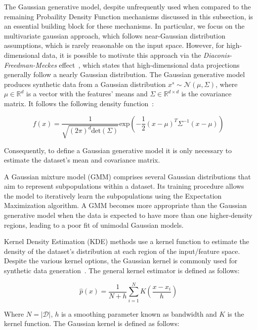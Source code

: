\documentclass[parskip=full]{scrartcl}
\begin{document}
The Gaussian generative model, despite unfrequently used when compared to the
remaining Probaility Density Function mechanisms discussed in this subsection,
is an essential building block for these mechanisms. In particular, we focus
on the multivariate gaussian approach, which follows near-Gaussian
distribution assumptions, which is rarely reasonable on the input space.
However, for high-dimensional data, it is possible to motivate this approach
via the \textit{Diaconis-Freedman-Meckes} effect~\cite{meckes2012projections},
which states that high-dimensional data projections generally follow a nearly
Gaussian distribution. The Gaussian generative model produces synthetic data
from a Gaussian distribution $x^s \sim \mathcal{N}(\mu, \Sigma)$, where $\mu
\in \mathbb{R}^d$ is a vector with the features' means and $\Sigma \in
\mathbb{R}^{d \times d}$ is the covariance matrix. It follows the following
density function~\cite{chanyaswad2019ron}:

\begin{equation}\label{eq:gaussian}
    f(x) =
    \frac{1}{\sqrt{(2\pi)^d\text{det}(\Sigma)}}\text{exp}\left(-\frac{1}{2}(x-\mu)^T\Sigma^{-1}(x-\mu)\right)
\end{equation}

Consequently, to define a Gaussian generative model it is only necessary to
estimate the dataset's mean and covariance matrix.

A Gaussian mixture model (GMM) comprises several Gaussian distributions that
aim to represent subpopulations within a dataset. Its training procedure
allows the model to iteratively learn the subpopulations using the Expectation
Maximization algorithm. A GMM becomes more appropriate than the Gaussian
generative model when the data is expected to have more than one
higher-density regions, leading to a poor fit of unimodal Gaussian models.

Kernel Density Estimation (KDE) methods use a kernel function to estimate the
density of the dataset's distribution at each region of the input/feature
space. Despite the various kernel options, the Gaussian kernel is commonly
used for synthetic data generation~\cite{tang2015kerneladasyn}. The general
kernel estimator is defined as follows: 

\begin{equation}
    \hat{p}(x) = \frac{1}{N+h}
    \sum_{i=1}^{N}K\left(\frac{x-x_i}{h}\right)
\end{equation}

Where $N = |\mathcal{D}|$, $h$ is a smoothing parameter known as bandwidth and
$K$ is the kernel function. The Gaussian kernel is defined as follows:
\end{document}
